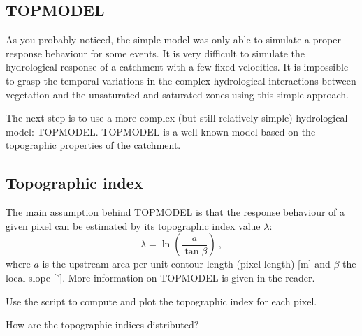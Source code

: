 \documentclass[twocolumn, 10pt, a4paper]{article}
\newenvironment{PC_prac_environment}{
\def\Q{\noindent \color{Gray}\rule[-0.1cm]{\columnwidth}{1.5pt}  \color{black} } \let\ques\Q 
\def\nQ{\noindent \color{black} } \let\ques\nQ 
\def\E{\color{Gray}\rule[0.3cm]{\columnwidth}{1.5pt} \color{black}} \let\ques\E }
\newcommand{\A}[2] { \ifthenelse{\boolean{showanswer}} {\noindent \color{cyan}{#2}\color{black}} {\multido{}{#1}{\noindent \color{light-gray}\hrulefill\\} } }
\begin{document}
\begin{PC_prac_environment}
\vspace{-5mm}
\section{TOPMODEL} \label{sec:topmodel}
As you probably noticed, the simple model was only able to simulate a proper response behaviour for some events. It is very difficult to simulate the hydrological response of a catchment with a few fixed velocities. It is impossible to grasp the temporal variations in the complex hydrological interactions between vegetation and the unsaturated and saturated zones using this simple approach. 

The next step is to use a more complex (but still relatively simple) hydrological model: TOPMODEL. TOPMODEL is a well-known model based on the topographic properties of the catchment. 

\subsection{Topographic index}
The main assumption behind TOPMODEL is that the response behaviour of a given pixel can be estimated by its topographic index value $\lambda$:
\[ \lambda = \ln \left( \frac{a}{\tan \beta}\right)\ ,\]
where $a$ is the upstream area per unit contour length (pixel length) [m] and $\beta$ the local slope [$^\circ$]. More information on TOPMODEL is given in the reader.

Use the script to compute and plot the topographic index for each pixel.

\Q How are the topographic indices distributed?\\
\E


\end{PC_prac_environment}
\end{document}
